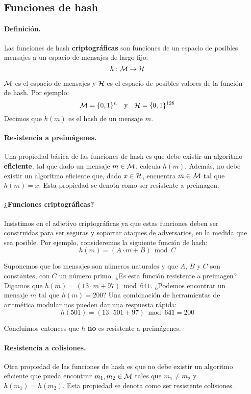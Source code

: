 \subsection{Funciones de hash}

\paragraph{Definición.} Las funciones de hash \textbf{criptográficas} son funciones de un espacio de posibles mensajes a un espacio de mensajes de largo fijo:
$$
    h: \mathcal{M} \to \mathcal{H}
$$

$\mathcal{M}$ es el espacio de mensajes y $\mathcal{H}$ es el espacio de posibles valores de la función de hash. Por ejemplo:
$$
    \mathcal{M} = \{0,1\}^n \quad \text{y} \quad \mathcal{H} = \{0,1\}^{128}
$$
Decimos que $h(m)$ es el hash de un mensaje $m$. \medbreak

\paragraph{Resistencia a preimágenes.} Una propiedad básica de las funciones de hash es que debe existir un algoritmo \textbf{eficiente}, tal que dado un mensaje $m \in \mathcal{M}$, calcula $h(m)$. Además, no debe existir un algoritmo eficiente que, dado $x \in \mathcal{H}$, encuentra $m \in \mathcal{M}$ tal que $h(m) = x$. Esta propiedad se denota como ser resistente a preimagen.

\paragraph{¿Funciones criptográficas?} Insistimos en el adjetivo criptográficas ya que estas funciones deben ser construidas para ser seguras y soportar ataques de adversarios, en la medida que sea posible. Por ejemplo, consideremos la siguiente función de hash:
$$
    h(m) = (A \cdot m + B) \bmod C
$$

Suponemos que los mensajes son números naturales y que $A$, $B$ y $C$ son constantes, con $C$ un número primo. ¿Es esta función resistente a preimagen? Digamos que $h(m) = (13 \cdot m + 97) \bmod 641$. ¿Podemos encontrar un mensaje $m$ tal que $h(m) = 200$? Una combinación de herramientas de aritmética modular nos pueden dar una respuesta rápida:
$$
    h(501) = (13 \cdot 501 + 97) \bmod 641 = 200
$$

Concluimos entonces que $h$ \textbf{no} es resistente a preimágenes.

\paragraph{Resistencia a colisiones.} Otra propiedad de las funciones de hash es que no debe existir un algoritmo eficiente que pueda encontrar $m_1, m_2 \in \mathcal{M}$ tales que $m_1 \neq m_2$ y $h(m_1) = h(m_2)$. Esta propiedad se denota como ser resistente colisiones.

